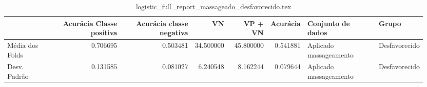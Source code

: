 \begin{table}
\centering
\caption{logistic_full_report_massageado_desfavorecido.tex}
\label{logistic_full_report_massageado_desfavorecido.tex}
\begin{tabular}{lrrrrrll}
\toprule
{} &  Acurácia Classe positiva &  Acurácia classe negativa &        VN  &   VP + VN  &  Acurácia &       Conjunto de dados &          Grupo \\
\midrule
Média dos Folds &                  0.706695 &                  0.503481 &  34.500000 &  45.800000 &  0.541881 &  Aplicado massageamento &  Desfavorecido \\
Desv. Padrão    &                  0.131585 &                  0.081027 &   6.240548 &   8.162244 &  0.079644 &  Aplicado massageamento &  Desfavorecido \\
\bottomrule
\end{tabular}
\end{table}
